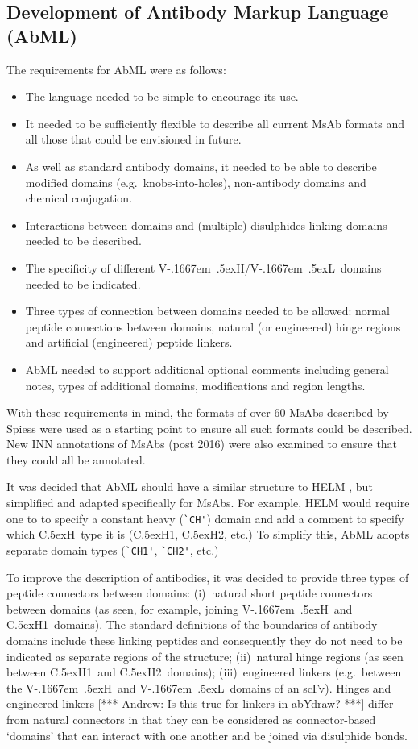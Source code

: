 \documentclass[a4paper]{article}
\newcommand{\VH}{\mbox{V\kern-.1667em \lower.5ex\hbox{\scriptsize H}}}
\newcommand{\VL}{\mbox{V\kern-.1667em \lower.5ex\hbox{\scriptsize L}}}
\newcommand{\VHVL}{\mbox{\VH/\VL}}
\newcommand{\CH}[1]{\mbox{C\lower.5ex\hbox{\scriptsize H}#1}}
\newcommand{\andrew}[1]{{\color{red} [*** Andrew: #1 ***]}}
\let\shortcite\cite
\begin{document}
\subsection{Development of Antibody Markup Language (AbML)}
The requirements for AbML were as follows:
\begin{itemize}
\item The language needed to be simple to encourage its use.
\item It needed to be sufficiently flexible to describe all current
  MsAb formats and all those that could be envisioned in future.
\item As well as standard antibody domains, it needed to be able to
  describe modified domains (e.g.\ knobs-into-holes), non-antibody
  domains and chemical conjugation.
\item Interactions between domains and (multiple) disulphides linking
  domains needed to be described.
\item The specificity of different \VHVL\ domains needed to be
  indicated.
\item Three types of connection between domains needed to be allowed:
  normal peptide connections between domains, natural (or engineered)
  hinge regions and artificial (engineered) peptide linkers.
\item AbML needed to support additional optional comments including
  general notes, types of additional domains, modifications and region
  lengths.
\end{itemize}
  
With these requirements in mind, the formats of over 60 MsAbs
described by Spiess \shortcite{spiess:2015} were used as a starting
point to ensure all such formats could be described. New INN
annotations of MsAbs (post 2016) were also examined to ensure that
they could all be annotated.

It was decided that AbML should have a similar structure to HELM
\cite{zhang:2012}, but simplified and adapted specifically for MsAbs.
For example, HELM would require one to
to specify a constant heavy (\verb|`CH'|) domain and add a
comment to specify which \CH\ type it is (\CH{1}, \CH{2}, etc.)
To simplify this, AbML adopts separate domain types (\verb|`CH1'|,
\verb|`CH2'|, etc.)

To improve the description of antibodies, it was decided to provide
three types of peptide connectors between domains: (i)~natural short
peptide connectors between domains (as seen, for example, joining \VH\
and \CH1\ domains). The standard definitions of the boundaries of
antibody domains include these linking peptides and consequently they
do not need to be indicated as separate regions of the structure;
(ii)~natural hinge regions (as seen between \CH1\ and \CH2\ domains);
(iii)~engineered linkers (e.g.\ between the \VH\ and \VL\ domains of
an scFv). Hinges and engineered linkers \andrew{Is this true for
  linkers in abYdraw?} differ from natural connectors in that they can
be considered as connector-based `domains' that can interact with one
another and be joined via disulphide bonds.
\end{document}
